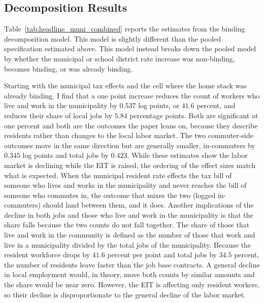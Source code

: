 \documentclass[12pt]{article}
\begin{document}
\subsection{Decomposition Results}
\label{subsec:results-decomp}
\label{subsec:results-headline}

Table~\ref{tab:headline_muni_combined}
reports the estimates from the binding decomposition model. This model is slightly different than the pooled specification estimated above. This model instead breaks down the pooled model by whether the municipal or school district rate increase was non-binding, becomes binding, or was already binding.




Starting with the municipal tax effects and the cell where the home stack was already
binding. I find that a one point increase reduces the count of workers who
live and work in the municipality by $0.537$ log points, or $41.6$
percent, and reduces their share of local jobs by $5.84$ percentage
points. Both are significant at one percent and both are the outcomes the
paper leans on, because they describe residents rather than changes to the local labor market. The two commuter-side outcomes move in the same direction but are generally smaller, in-commuters by $0.345$ log points and total jobs by $0.423$. While these estimates show the labor market is declining while the EIT is raised, the ordering of the effect sizes match what is expected. When the municipal
resident rate effects the tax bill of someone who lives and works in the
municipality and never reaches the bill of someone who commutes in,
the outcome that mixes the two (logged in-commuters) should land between them, and it does. Another implications of the decline in both jobs and those who live and work in the municipality is that the share falls because the two counts do not fall together. The share of those that live and work in the community is defined as the number of those that work and live in a municipality divided by the total jobs of the municipality. Because the resident
workforce drops by $41.6$ percent per point and total jobs by
$34.5$ percent, the number of residents leave faster than the job base contracts. A general
decline in local employment would, in theory, move both counts by similar amounts and the share would be near zero. However, the EIT is affecting only resident workers, so their decline is disproportionate to the general decline of the labor market.
\end{document}
